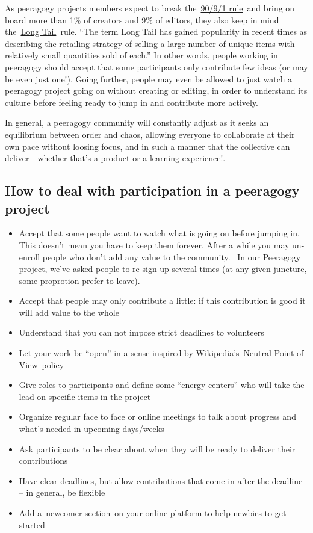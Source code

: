 As peeragogy projects members expect to break
the~\href{http://en.wikipedia.org/wiki/1\%25\_rule\_\%28Internet\_culture\%29}{90/9/1
rule}~and bring on board more than 1\% of creators and 9\% of editors,
they also keep in mind
the~\href{http://en.wikipedia.org/wiki/Long\_Tail}{Long Tail}~rule.
``The term Long Tail has gained popularity in recent times as describing
the retailing strategy of selling a large number of unique items with
relatively small quantities sold of each.'' In other words, people
working in peeragogy should accept that some participants only
contribute few ideas (or may be even just one!). Going further, people
may even be allowed to just watch a peeragogy project going on without
creating or editing, in order to understand its culture before feeling
ready to jump in and contribute more actively.

In general, a peeragogy community will constantly adjust as it seeks an
equilibrium between order and chaos, allowing everyone to collaborate at
their own pace without loosing focus, and in such a manner that the
collective can deliver - whether that's a product or a learning
experience!.

\subsection{How to deal with participation in a peeragogy project}

\begin{itemize}
\item
  Accept that some people want to watch what is going on before jumping
  in. This doesn't mean you have to keep them forever. After a while you
  may un-enroll people who don't add any value to the community.~ In our
  Peeragogy project, we've asked people to re-sign up several times (at
  any given juncture, some proprotion prefer to leave).
\item
  Accept that people may only contribute a little: if this contribution
  is good it will add value to the whole
\item
  Understand that you can not impose strict deadlines to volunteers
\item
  Let your work be ``open'' in a sense inspired by
  Wikipedia's~\href{http://en.wikipedia.org/wiki/Wikipedia:Neutral\_point\_of\_view}{Neutral
  Point of View}~policy
\item
  Give roles to participants and define some ``energy centers'' who will
  take the lead on specific items in the project
\item
  Organize regular face to face or online meetings to talk about
  progress and what's needed in upcoming days/weeks
\item
  Ask participants to be clear about when they will be ready to deliver
  their contributions
\item
  Have clear deadlines, but allow contributions that come in after the
  deadline -- in general, be flexible
\item
  Add a~newcomer section~on your online platform to help newbies to get
  started
\end{itemize}
